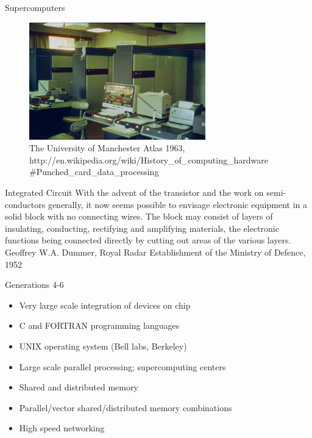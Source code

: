 \documentclass[xcolor=x11names,compress]{beamer}
\renewcommand{\(}{\begin{columns}}
\renewcommand{\)}{\end{columns}}
\newcommand{\<}[1]{\begin{column}{#1}}
\renewcommand{\>}{\end{column}}
\begin{document}
\begin{frame}{Supercomputers}

\begin{figure}
\includegraphics[height=2in,clip]{Atlas1963}
\caption{The University of Manchester Atlas 1963, http://en.wikipedia.org/wiki/History\_of\_computing\_hardware
\#Punched\_card\_data\_processing}
\end{figure}

\end{frame}

\begin{frame}{Integrated Circuit}
With the advent of the transistor and the work on semi-conductors generally, it now seems possible to envisage electronic equipment in a solid block with no connecting wires. The block may consist of layers of insulating, conducting, rectifying and amplifying materials, the electronic functions being connected directly by cutting out areas of the various layers.\\
\vspace*{1.5 em}
\hspace*{0.5 in}Geoffrey W.A. Dummer, Royal Radar Establishment of the Ministry of Defence, 1952

\end{frame}

\begin{frame}{Generations 4-6}
\begin{itemize}
\item Very large scale integration of devices on chip
\item C and FORTRAN programming languages
\item UNIX operating system (Bell labs, Berkeley)
\item Large scale parallel processing; supercomputing centers
\item Shared and distributed memory
\item Parallel/vector shared/distributed memory combinations
\item High speed networking
\end{itemize}
\end{frame}
\end{document}
